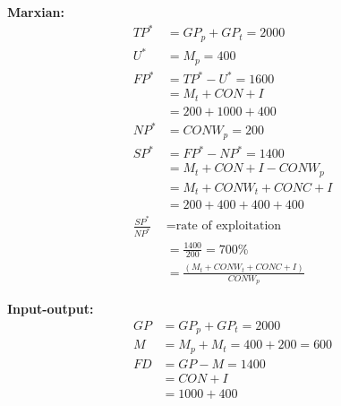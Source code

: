 \textbf{Marxian:}
\begin{align*}
TP^* &= GP_p + GP_t = 2000 \\
U^* &= M_p = 400 \\
FP^* &= TP^* - U^* = 1600 \\
&= M_t + CON + I \\
&= 200 + 1000 + 400 \\
NP^* &= CONW_p = 200 \\
SP^* &= FP^* - NP^* = 1400 \\
&= M_t + CON + I - CONW_p \\
&= M_t + CONW_t + CONC + I \\
&= 200 + 400 + 400 + 400 \\
\frac{SP^*}{NP^*} &= \text{rate of exploitation} \\
&= \frac{1400}{200} = 700\% \\
&= \frac{(M_t + CONW_t + CONC + I)}{CONW_p}
\end{align*}

\textbf{Input-output:}
\begin{align*}
GP &= GP_p + GP_t = 2000 \\
M &= M_p + M_t = 400 + 200 = 600 \\
FD &= GP - M = 1400 \\
&= CON + I \\
&= 1000 + 400
\end{align*}

